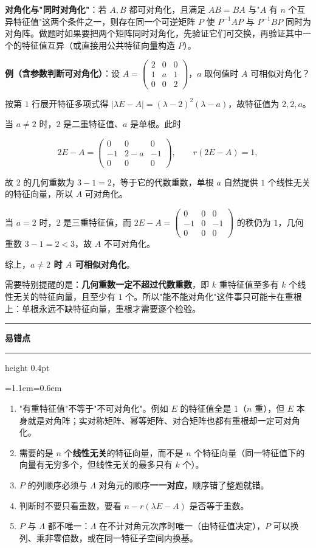 \documentclass[11pt,openany,UTF8]{ctexbook}
\newcommand{\callouthead}[2]{%
  \par\addvspace{7pt}\noindent
  {\color{#1}\rule[-0.15em]{3pt}{1.05em}}\hspace{0.5em}%
  {\bfseries\color{#1}#2}\par\nobreak\vspace{-0.35em}%
  {\color{rulesep}\hrule height 0.4pt}\nobreak\vspace{0.45em}%
  \begingroup\small\setlength{\parindent}{0pt}%
  \leftskip=1.1em\rightskip=0.6em\noindent\ignorespaces}
\newcommand{\calloutend}{\par\endgroup\addvspace{7pt}}
\newenvironment{callwarn}[1]{\callouthead{warnbar}{#1}}{\calloutend}
\begin{document}
\textbf{对角化与"同时对角化"}：若 $A,B$ 都可对角化，且满足 $AB=BA$ 与"$A$ 有 $n$ 个互异特征值"这两个条件之一，则存在同一个可逆矩阵 $P$ 使 $P^{-1}AP$ 与 $P^{-1}BP$ 同时为对角阵。做题时如果要把两个矩阵同时对角化，先验证它们可交换，再验证其中一个的特征值互异（或直接用公共特征向量构造 $P$）。

\textbf{例（含参数判断可对角化）}：设 $A=\begin{pmatrix}2&0&0\\1&a&1\\0&0&2\end{pmatrix}$，$a$ 取何值时 $A$ 可相似对角化？

按第 $1$ 行展开特征多项式得 $\vert\lambda E-A\vert=(\lambda-2)^2(\lambda-a)$，故特征值为 $2,2,a$。

当 $a\neq2$ 时，$2$ 是二重特征值、$a$ 是单根。此时

\[2E-A=\begin{pmatrix}0&0&0\\-1&2-a&-1\\0&0&0\end{pmatrix},\qquad r(2E-A)=1,\]

故 $2$ 的几何重数为 $3-1=2$，等于它的代数重数，单根 $a$ 自然提供 $1$ 个线性无关的特征向量，所以 $A$ 可对角化。

当 $a=2$ 时，$2$ 是三重特征值，而 $2E-A=\begin{pmatrix}0&0&0\\-1&0&-1\\0&0&0\end{pmatrix}$ 的秩仍为 $1$，几何重数 $3-1=2<3$，故 $A$ 不可对角化。

综上，\textbf{$a\neq2$ 时 $A$ 可相似对角化}。

需要特别提醒的是：\textbf{几何重数一定不超过代数重数}，即 $k$ 重特征值至多有 $k$ 个线性无关的特征向量，且至少有 $1$ 个。所以"能不能对角化"这件事只可能卡在重根上：单根永远不缺特征向量，重根才需要逐个检验。

\begin{callwarn}{易错点}
\begin{enumerate}
\item "有重特征值"不等于"不可对角化"。例如 $E$ 的特征值全是 $1$（$n$ 重），但 $E$ 本身就是对角阵；实对称矩阵、幂等矩阵、对合矩阵也都有重根却一定可对角化。
\item 需要的是 $n$ 个\textbf{线性无关}的特征向量，而不是 $n$ 个特征向量（同一特征值下的向量有无穷多个，但线性无关的最多只有 $k$ 个）。
\item $P$ 的列顺序必须与 $\Lambda$ 对角元的顺序\textbf{一一对应}，顺序错了整题就错。
\item 判断时不要只看重数，要看 $n-r(\lambda E-A)$ 是否等于重数。
\item $P$ 与 $\Lambda$ 都不唯一：$\Lambda$ 在不计对角元次序时唯一（由特征值决定），$P$ 可以换列、乘非零倍数，或在同一特征子空间内换基。
\end{enumerate}
\end{callwarn}
\end{document}
